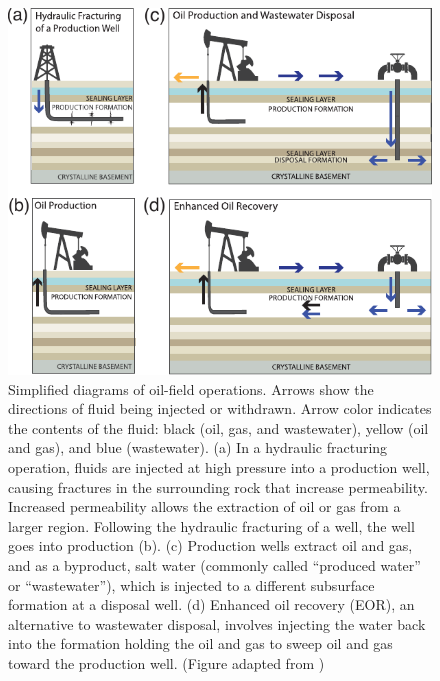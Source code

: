 \begin{figure}
	\centering
	\includegraphics[width=\linewidth]{figures/chapter3-permian/oil-page-square.pdf}
	\caption[Diagram of unconventional oil production operations]{
		Simplified diagrams of oil-field operations. Arrows show the directions of fluid being injected or withdrawn. Arrow color indicates the contents of the fluid: black (oil, gas, and wastewater), yellow (oil and gas), and blue (wastewater). 
		(a) In a hydraulic fracturing operation, fluids are injected at high pressure into a production well, causing fractures in the surrounding rock that increase permeability. Increased permeability allows the extraction of oil or gas from a larger region. Following the hydraulic fracturing of a well, the well goes into production (b). 
		(c) Production wells extract oil and gas, and as a byproduct, salt water (commonly called ``produced water'' or ``wastewater''), which is injected to a different subsurface formation at a disposal well. 
		(d) Enhanced oil recovery (EOR), an alternative to wastewater disposal, involves injecting the water back into the formation holding the oil and gas to sweep oil and gas toward the production well.
		(Figure adapted from \citep{Rubinstein2015MythsFactsWastewater})
	}
	\label{fig:ch3-oil-drilling}
\end{figure}



